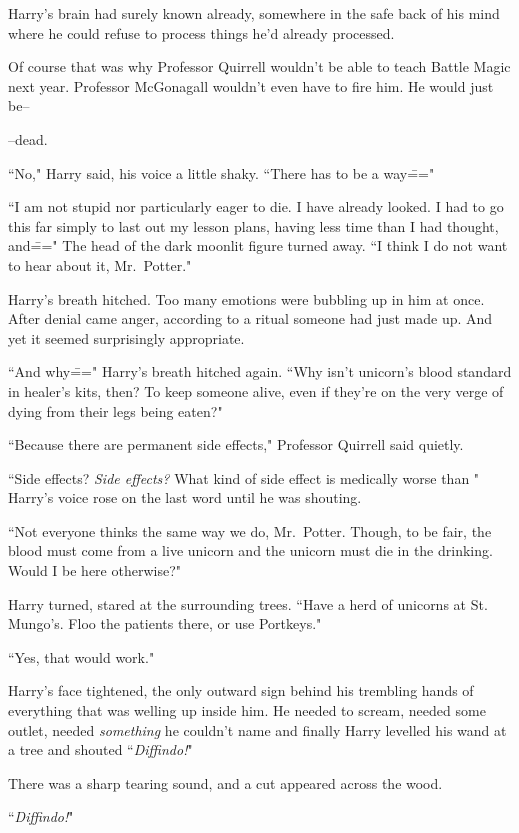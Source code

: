 Harry's brain had surely known already, somewhere in the safe back of his mind where he could refuse to process things he'd already processed.

Of course that was why Professor Quirrell wouldn't be able to teach Battle Magic next year. Professor McGonagall wouldn't even have to fire him. He would just be\---

\---dead.

``No," Harry said, his voice a little shaky. ``There has to be a way\==="

``I am not stupid nor particularly eager to die. I have already looked. I had to go this far simply to last out my lesson plans, having less time than I had thought, and\===" The head of the dark moonlit figure turned away. ``I think I do not want to hear about it, Mr.~Potter."

Harry's breath hitched. Too many emotions were bubbling up in him at once. After denial came anger, according to a ritual someone had just made up. And yet it seemed surprisingly appropriate.

``And why\===" Harry's breath hitched again. ``Why isn't unicorn's blood standard in healer's kits, then? To keep someone alive, even if they're on the very verge of dying from their legs being eaten?"

``Because there are permanent side effects," Professor Quirrell said quietly.

``Side effects? \emph{Side effects?} What kind of side effect is medically worse than " Harry's voice rose on the last word until he was shouting.

``Not everyone thinks the same way we do, Mr.~Potter. Though, to be fair, the blood must come from a live unicorn and the unicorn must die in the drinking. Would I be here otherwise?"

Harry turned, stared at the surrounding trees. ``Have a herd of unicorns at St. Mungo's. Floo the patients there, or use Portkeys."

``Yes, that would work."

Harry's face tightened, the only outward sign behind his trembling hands of everything that was welling up inside him. He needed to scream, needed some outlet, needed \emph{something} he couldn't name and finally Harry levelled his wand at a tree and shouted ``\emph{Diffindo!}"

There was a sharp tearing sound, and a cut appeared across the wood.

``\emph{Diffindo!}"

